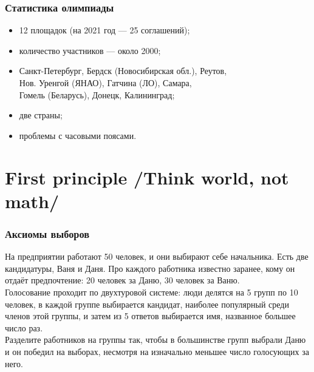 \documentclass[aspectratio=1610,12pt]{beamer}
\def\uslx#1{\vspace{-6mm} \begin{block}{\vspace*{-3ex}} #1 \end{block}}
\begin{document}
\begin{frame}\frametitle{Статистика олимпиады}
\begin{itemize}
	\item 12 площадок (на 2021 год — 25 соглашений);\\
	\item количество участников --- около 2000;\\
	\item Санкт-Петербург, Бердск (Новосибирская обл.), Реутов, \\
		Нов. Уренгой (ЯНАО), Гатчина (ЛО), Самара, \\
		Гомель (Беларусь), Донецк, Калининград;\\
	\item две страны;\\
	\item проблемы с часовыми поясами.
\end{itemize}\end{frame}

\section[Мир]{First principle /Think world, not math/}

\begin{frame}
\frametitle{Аксиомы выборов}

\uslx{На предприятии работают 50 человек, и они выбирают себе начальника. Есть две кандидатуры, Ваня и Даня. Про каждого работника известно заранее, кому он отдаёт предпочтение: 20 человек за Даню, 30 человек за Ваню. \smallskip \\
Голосование проходит по двухтуровой системе: люди делятся на 5 групп по 10 человек, в каждой группе выбирается кандидат, наиболее популярный среди членов этой группы, и затем из 5 ответов выбирается имя, названное большее число раз. \smallskip \\
Разделите работников на группы так, чтобы в большинстве групп выбрали Даню и он победил на выборах, несмотря на изначально меньшее число голосующих за него.}
\end{frame}
\end{document}
